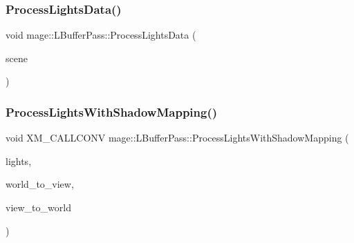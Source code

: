 \subsubsection{\texorpdfstring{Process\+Lights\+Data()}{ProcessLightsData()}}
{\footnotesize\ttfamily void mage\+::\+L\+Buffer\+Pass\+::\+Process\+Lights\+Data (\begin{DoxyParamCaption}\item[{const \hyperlink{structmage_1_1_pass_buffer}{Pass\+Buffer} $\ast$}]{scene }\end{DoxyParamCaption})\hspace{0.3cm}{\ttfamily [private]}}

\hypertarget{structmage_1_1_l_buffer_pass_a4dc1726c775bb3f512e9ac32c7c0ef2c}{}\label{structmage_1_1_l_buffer_pass_a4dc1726c775bb3f512e9ac32c7c0ef2c} 
\subsubsection{\texorpdfstring{Process\+Lights\+With\+Shadow\+Mapping()}{ProcessLightsWithShadowMapping()}\hspace{0.1cm}{\footnotesize\ttfamily [1/3]}}
{\footnotesize\ttfamily void X\+M\+\_\+\+C\+A\+L\+L\+C\+O\+NV mage\+::\+L\+Buffer\+Pass\+::\+Process\+Lights\+With\+Shadow\+Mapping (\begin{DoxyParamCaption}\item[{const vector$<$ const \hyperlink{namespacemage_a7637b5351fc0f66a10badd80ebb35899}{Directional\+Light\+Node} $\ast$ $>$ \&}]{lights,  }\item[{F\+X\+M\+M\+A\+T\+R\+IX}]{world\+\_\+to\+\_\+view,  }\item[{C\+X\+M\+M\+A\+T\+R\+IX}]{view\+\_\+to\+\_\+world }\end{DoxyParamCaption})\hspace{0.3cm}{\ttfamily [private]}}

\hypertarget{structmage_1_1_l_buffer_pass_a6623fb2306e894bef9e427b3794ab37d}{}\label{structmage_1_1_l_buffer_pass_a6623fb2306e894bef9e427b3794ab37d} 
